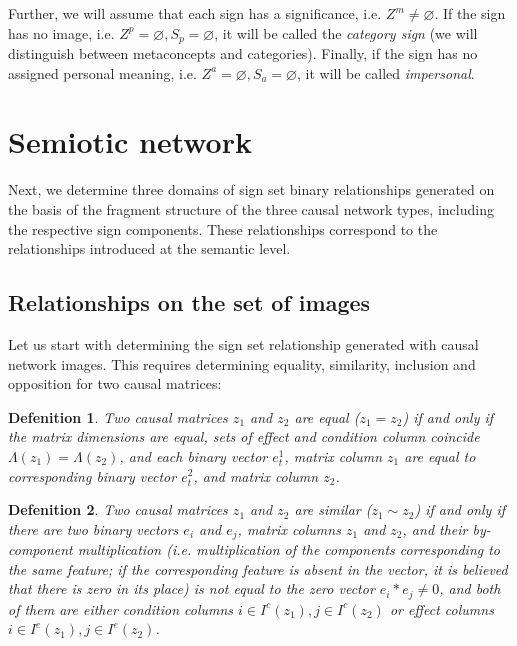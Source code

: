 \documentclass[12pt]{scrartcl}
\newtheorem{definition}{Defenition}
\begin{document}
	Further, we will assume that each sign has a significance, i.e. $Z^m\not = \varnothing$. If the sign has no image, i.e. $Z^p=\varnothing,S_p=\varnothing$, it will be called the \textit{category sign} (we will distinguish between metaconcepts and categories). Finally, if the sign has no assigned personal meaning, i.e. $Z^a=\varnothing, S_a=\varnothing$, it will be called \textit{impersonal}.
		
	\section{Semiotic network}\label{sec:semnetwork}
	
	Next, we determine three domains of sign set binary relationships generated on the basis of the fragment structure of the three causal network types, including the respective sign components. These relationships correspond to the relationships introduced at the semantic level.
		
	\subsection{Relationships on the set of images}	
	
	Let us start with determining the sign set relationship generated with causal network images. This requires determining equality, similarity, inclusion and opposition for two causal matrices:
	
	\begin{definition}
		Two causal matrices $z_1$ and $z_2$ are equal ($z_1=z_2$) if and only if the matrix dimensions are equal, sets of effect and condition column coincide $\Lambda({z_1})=\Lambda({z_2})$, and each binary vector $e_t^1$, matrix column $z_1$ are equal to corresponding binary vector $e_t^2$, and matrix column $z_2$.
	\end{definition}
	
	\begin{definition}
		Two causal matrices $z_1$ and $z_2$ are similar ($z_1\sim z_2$) if and only if there are two binary vectors $e_i$ and $e_j$, matrix columns $z_1$ and $z_2$, and their by-component multiplication (i.e. multiplication of the components corresponding to the same feature; if the corresponding feature is absent in the vector, it is believed that there is zero in its place) is not equal to the zero vector $e_i*e_j\not = 0$, and both of them are either condition columns $i\in I^c(z_1), j\in I^c(z_2)$ or effect columns $i\in I^e(z_1), j\in I^e(z_2)$.
	\end{definition}
	
\end{document}
